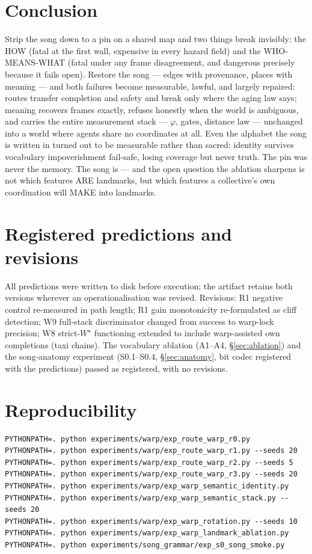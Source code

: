 \documentclass{article}
\newcommand{\wstar}{W^{\star}}
\begin{document}
\section{Conclusion}

Strip the song down to a pin on a shared map and two things break
invisibly: the HOW (fatal at the first wall, expensive in every
hazard field) and the WHO-MEANS-WHAT (fatal under any frame
disagreement, and dangerous precisely because it fails open). Restore
the song --- edges with provenance, places with meaning --- and both
failures become measurable, lawful, and largely repaired: routes
transfer completion and safety and break only where the aging law
says; meaning recovers frames exactly, refuses honestly when the
world is ambiguous, and carries the entire measurement stack ---
$\varphi$, gates, distance law --- unchanged into a world where
agents share no coordinates at all. Even the alphabet the song is
written in turned out to be measurable rather than sacred: identity
survives vocabulary impoverishment fail-safe, losing coverage but
never truth. The pin was never the memory. The song is --- and the
open question the ablation sharpens is not which features ARE
landmarks, but which features a collective's own coordination will
MAKE into landmarks.

\appendix

\section{Registered predictions and revisions}
\label{app:registered}
All predictions were written to disk before execution; the artifact
retains both versions wherever an operationalisation was revised.
Revisions: R1 negative control re-measured in path length; R1 gain
monotonicity re-formulated as cliff detection; W9 full-stack
discriminator changed from success to warp-lock precision; W8
strict-$\wstar$ functioning extended to include warp-assisted own
completions (taxi chains). The vocabulary ablation (A1--A4,
\S\ref{sec:ablation}) and the song-anatomy experiment (S0.1--S0.4,
\S\ref{sec:anatomy}, bit codec registered with the predictions)
passed as registered, with no revisions.

\section{Reproducibility}
\label{app:repro}
\begin{verbatim}
PYTHONPATH=. python experiments/warp/exp_route_warp_r0.py
PYTHONPATH=. python experiments/warp/exp_route_warp_r1.py --seeds 20
PYTHONPATH=. python experiments/warp/exp_route_warp_r2.py --seeds 5
PYTHONPATH=. python experiments/warp/exp_route_warp_r3.py --seeds 20
PYTHONPATH=. python experiments/warp/exp_warp_semantic_identity.py
PYTHONPATH=. python experiments/warp/exp_warp_semantic_stack.py --seeds 20
PYTHONPATH=. python experiments/warp/exp_warp_rotation.py --seeds 10
PYTHONPATH=. python experiments/warp/exp_warp_landmark_ablation.py
PYTHONPATH=. python experiments/song_grammar/exp_s0_song_smoke.py
\end{verbatim}
\end{document}
